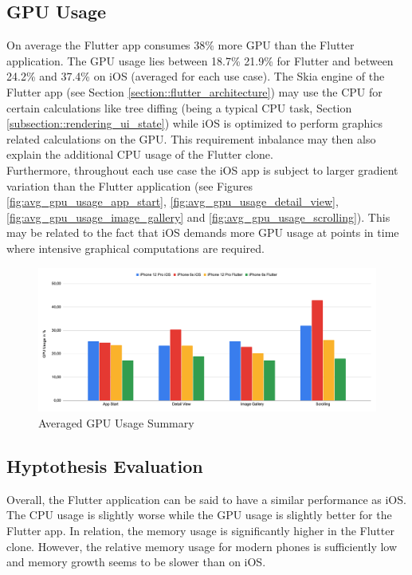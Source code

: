 \subsection{GPU Usage}
On average the Flutter app consumes 38\% more GPU than the Flutter application. The GPU usage lies between 18.7\% 21.9\% for Flutter and between 24.2\% and 37.4\% on iOS (averaged for each use case).
The Skia engine of the Flutter app (see Section \ref{section::flutter_architecture}) may use the CPU for certain calculations like tree diffing (being a typical CPU task, Section \ref{subsection::rendering_ui_state}) while iOS is optimized to perform graphics related calculations on the GPU.
This requirement inbalance may then also explain the additional CPU usage of the Flutter clone.\\
Furthermore, throughout each use case the iOS app is subject to larger gradient variation than the Flutter application (see Figures \ref{fig:avg_gpu_usage_app_start}, \ref{fig:avg_gpu_usage_detail_view}, \ref{fig:avg_gpu_usage_image_gallery} and \ref{fig:avg_gpu_usage_scrolling}).
This may be related to the fact that iOS demands more GPU usage at points in time where intensive graphical computations are required.

\begin{figure}[!h]
    \centering
    \includegraphics[width=\linewidth]{images/performance_results/summary_charts/avg_gpu_usage_summary.png}
    \caption{Averaged GPU Usage Summary}
    \label{fig:avg_gpu_usage_summary}
\end{figure}

\subsection{Hyptothesis Evaluation} \label{subsection::hypothesis_evaluation}
Overall, the Flutter application can be said to have a similar performance as iOS. The CPU usage is slightly worse while the GPU usage is slightly better for the Flutter app.
In relation, the memory usage is significantly higher in the Flutter clone. However, the relative memory usage for modern phones is sufficiently low and memory growth seems to be slower than
on iOS.

